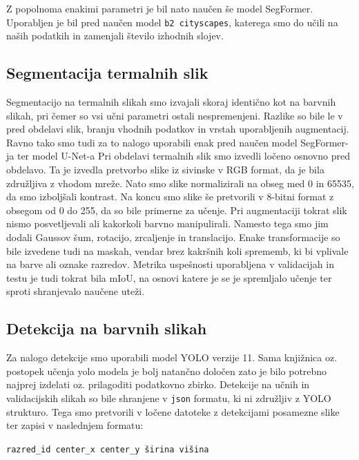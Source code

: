 \documentclass[10pt,twocolumn,letterpaper]{article}
\begin{document}
Z popolnoma enakimi parametri je bil nato naučen še model SegFormer. Uporabljen je bil pred naučen model \texttt{b2 cityscapes}, katerega smo do učili na naših podatkih in zamenjali število izhodnih slojev. 

\subsection{Segmentacija termalnih slik}
Segmentacijo na termalnih slikah smo izvajali skoraj identično kot na barvnih slikah, pri čemer so vsi učni parametri ostali nespremenjeni. Razlike so bile le v pred obdelavi slik, branju vhodnih podatkov in vrstah uporabljenih augmentacij. Ravno tako smo tudi za to nalogo uporabili enak pred naučen model SegFormer-ja ter model U-Net-a 
Pri obdelavi termalnih slik smo izvedli ločeno osnovno pred obdelavo. Ta je izvedla pretvorbo slike iz sivinske v RGB format, da je bila združljiva z vhodom mreže. Nato smo slike normalizirali na obseg med 0 in 65535, da smo izboljšali kontrast. Na koncu smo slike še pretvorili v 8-bitni format z obsegom od 0 do 255, da so bile primerne za učenje. 
Pri augmentaciji tokrat slik nismo posvetljevali ali kakorkoli barvno manipulirali. Namesto tega smo jim dodali Gaussov šum, rotacijo, zrcaljenje in translacijo. Enake transformacije so bile izvedene tudi na  maskah, vendar brez kakršnih koli sprememb, ki bi vplivale na barve ali oznake razredov. Metrika uspešnosti uporabljena v validacijah in testu je tudi tokrat bila mIoU, na osnovi katere je se je spremljalo učenje ter sproti shranjevalo naučene uteži.

\subsection{Detekcija na barvnih slikah}
Za nalogo detekcije smo uporabili model YOLO verzije 11. Sama knjižnica oz. postopek učenja yolo modela je bolj natančno določen zato je bilo potrebno najprej izdelati oz. prilagoditi podatkovno zbirko. Detekcije na učnih in validacijskih slikah so bile shranjene v \texttt{json} formatu, ki ni združljiv z YOLO strukturo. Tega smo pretvorili v ločene datoteke z detekcijami posamezne slike ter zapisi v naslednjem formatu:

{\small\texttt{razred\_id center\_x center\_y širina višina}}
\end{document}
